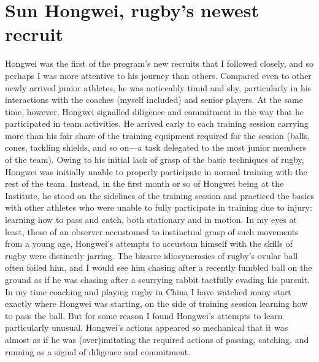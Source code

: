 \section{Sun Hongwei, rugby's newest recruit}
Hongwei was the first of the program’s new recruits that I followed closely, and so perhaps I was more attentive to his journey than others.  Compared even to other newly arrived junior athletes, he was noticeably timid and shy, particularly in his interactions with the coaches (myself included) and senior players.   At the same time, however, Hongwei signalled diligence and commitment in the way that he participated in team activities.  He arrived early to each training session carrying more than his fair share of the training equipment required for the session (balls, cones, tackling shields, and so on---a task delegated to the most junior members of the team). Owing to his initial lack of grasp of the basic techniques of rugby, Hongwei was initially unable to properly participate in normal training with the rest of the team. Instead, in the first month or so of Hongwei being at the Institute, he stood on the sidelines of the training session and practiced the basics with other athletes who were unable to fully participate in training due to injury: learning how to pass and catch, both stationary and in motion. In my eyes at least, those of an observer accustomed to instinctual grasp of such movements from a young age, Hongwei's attempts to accustom himself with the skills of rugby were distinctly jarring.  The bizarre idiosyncrasies of rugby's ovular ball often foiled him, and I would see him chasing after a recently fumbled ball on the ground as if he was chasing after a scurrying rabbit tactfully evading his pursuit.  In my time coaching and playing rugby in China I have watched many start exactly where Hongwei was starting, on the side of training session learning how to pass the ball.  But for some reason I found Hongwei’s attempts to learn particularly unusual.  Hongwei's actions appeared so mechanical that it was almost as if he was (over)imitating the required actions of passing, catching, and running as a signal of diligence and commitment.


